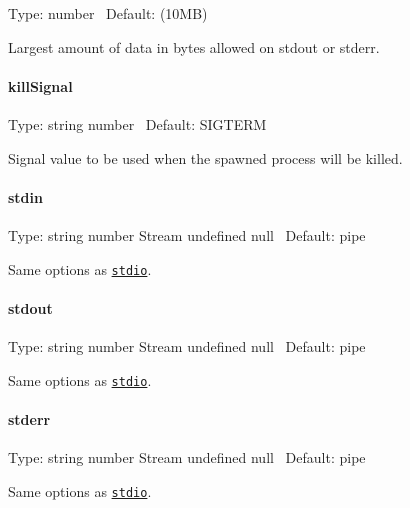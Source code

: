 Type\+: {\ttfamily number}~\newline
 Default\+: {} (10\+MB)

Largest amount of data in bytes allowed on {\ttfamily stdout} or {\ttfamily stderr}.

\paragraph*{kill\+Signal}

Type\+: {\ttfamily string} {\ttfamily number}~\newline
 Default\+: {\ttfamily S\+I\+G\+T\+E\+RM}

Signal value to be used when the spawned process will be killed.

\paragraph*{stdin}

Type\+: {\ttfamily string} {\ttfamily number} {\ttfamily Stream} {\ttfamily undefined} {\ttfamily null}~\newline
 Default\+: {\ttfamily pipe}

Same options as \href{https://nodejs.org/dist/latest-v6.x/docs/api/child_process.html#child_process_options_stdio}{\tt {\ttfamily stdio}}.

\paragraph*{stdout}

Type\+: {\ttfamily string} {\ttfamily number} {\ttfamily Stream} {\ttfamily undefined} {\ttfamily null}~\newline
 Default\+: {\ttfamily pipe}

Same options as \href{https://nodejs.org/dist/latest-v6.x/docs/api/child_process.html#child_process_options_stdio}{\tt {\ttfamily stdio}}.

\paragraph*{stderr}

Type\+: {\ttfamily string} {\ttfamily number} {\ttfamily Stream} {\ttfamily undefined} {\ttfamily null}~\newline
 Default\+: {\ttfamily pipe}

Same options as \href{https://nodejs.org/dist/latest-v6.x/docs/api/child_process.html#child_process_options_stdio}{\tt {\ttfamily stdio}}.

